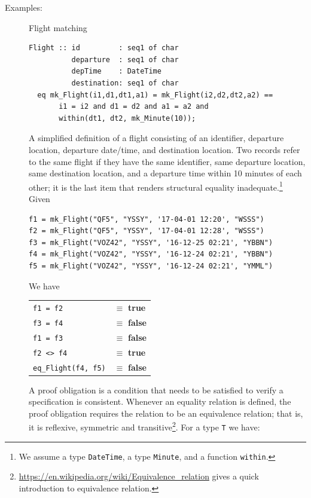 \documentclass{overturerepchap}
\newcommand{\keyw}[1]{{\bf\ttfamily #1}}
\begin{document}
\begin{description}
\item[Examples:]Flight matching
\begin{lstlisting}
Flight :: id         : seq1 of char
          departure  : seq1 of char
          depTime    : DateTime
          destination: seq1 of char
  eq mk_Flight(i1,d1,dt1,a1) = mk_Flight(i2,d2,dt2,a2) ==
       i1 = i2 and d1 = d2 and a1 = a2 and 
       within(dt1, dt2, mk_Minute(10));
\end{lstlisting}

A simplified definition of a flight consisting of an identifier, departure location, departure date/time, and destination location. Two records refer to the same flight if they have the same identifier, same departure location, same destination location, and a departure time within 10 minutes of each other; it is the last item that renders structural equality inadequate.\footnote{We assume a type {\tt DateTime}, a type {\tt Minute}, and a function {\tt within}.}
Given
\begin{lstlisting}
f1 = mk_Flight("QF5", "YSSY", '17-04-01 12:20', "WSSS")
f2 = mk_Flight("QF5", "YSSY", '17-04-01 12:28', "WSSS")
f3 = mk_Flight("VOZ42", "YSSY", '16-12-25 02:21', "YBBN")
f4 = mk_Flight("VOZ42", "YSSY", '16-12-24 02:21', "YBBN")
f5 = mk_Flight("VOZ42", "YSSY", '16-12-24 02:21', "YMML")
\end{lstlisting}
We have

\begin{tabular}{l l}
{\tt f1 = f2} & $\equiv$  \keyw{true} \\
{\tt f3 = f4} & $\equiv$  \keyw{false} \\
{\tt f1 = f3} & $\equiv$  \keyw{false} \\
{\tt f2 <> f4} & $\equiv$  \keyw{true} \\
{\tt eq\_Flight(f4, f5)} & $\equiv$  \keyw{false}\\ 
\end{tabular}

A proof obligation is a condition that needs to be satisfied to verify a specification is consistent.
Whenever an equality relation is defined, the proof obligation requires the relation to be an equivalence relation; that is, it is reflexive, symmetric and transitive\footnote{\url{https://en.wikipedia.org/wiki/Equivalence_relation} gives a quick introduction to equivalence relation.}.
For a type {\tt T} we have:


\end{description}
\end{document}
